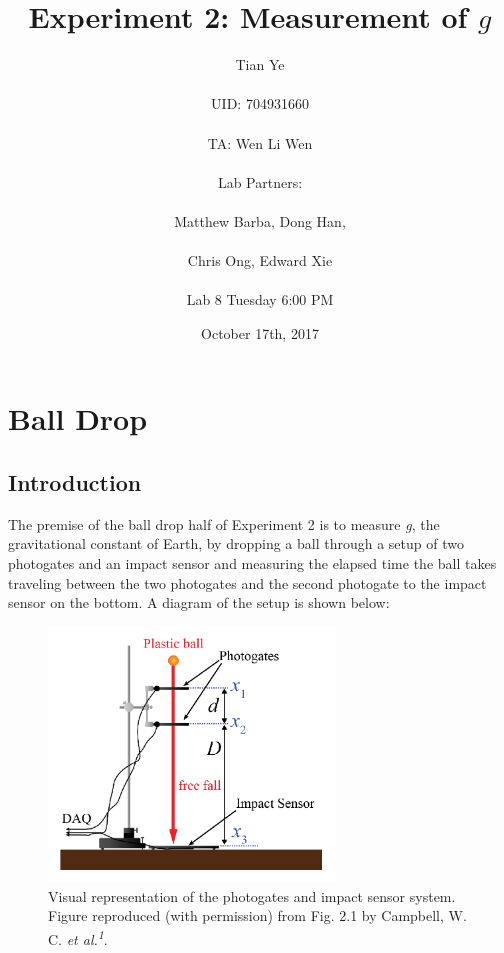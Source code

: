 \documentclass[titlepage]{article}
\begin{document}
\title{Experiment 2: Measurement of $g$}
\author{Tian Ye \\ \\ UID: 704931660 \\ \\ TA: Wen Li Wen \\ \\ Lab Partners: \\ \\ Matthew Barba, Dong Han,\\ \\ Chris Ong, Edward Xie \\ \\ Lab 8 Tuesday 6:00 PM}
\date{October 17th, 2017}

\maketitle

\section{Ball Drop}
\subsection{Introduction}
The premise of the ball drop half of Experiment 2 is to measure \textit{g}, the gravitational constant of Earth, by dropping a ball through a setup of two photogates and an impact sensor and measuring the elapsed time the ball takes traveling between the two photogates and the second photogate to the impact sensor on the bottom. A diagram of the setup is shown below:

\begin{figure}[!htbp]
    \centering
    \includegraphics[width=3.0in]{Setup.png}
    \caption{Visual representation of the photogates and impact sensor system. Figure reproduced
(with permission) from Fig. 2.1 by Campbell, W. C. \textit{et al.\textsuperscript{1}}.}
\end{figure}
\end{document}
